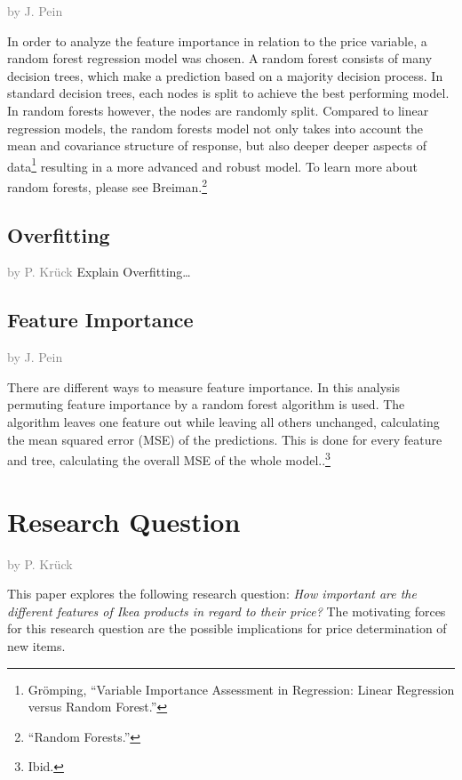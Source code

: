 \documentclass[a4paper, nobind]{templates/ociamthesis}
\begin{document}
\textcolor{gray}{by J. Pein}

In order to analyze the feature importance in relation to the price variable, a random forest regression model was chosen. A random forest consists of many decision trees, which make a prediction based on a majority decision process. In standard decision trees, each nodes is split to achieve the best performing model. In random forests however, the nodes are randomly split. Compared to linear regression models, the random forests model not only takes into account the mean and covariance structure of response, but also deeper deeper aspects of data\footnote{Grömping, ``Variable Importance Assessment in Regression: Linear Regression versus Random Forest.''} resulting in a more advanced and robust model. To learn more about random forests, please see Breiman.\footnote{``Random Forests.''}

\hypertarget{overfitting}{%
\subsection{Overfitting}\label{overfitting}}

\textcolor{gray}{by P. Krück}
Explain Overfitting\ldots{}

\hypertarget{feature-importance}{%
\subsection{Feature Importance}\label{feature-importance}}

\textcolor{gray}{by J. Pein}

There are different ways to measure feature importance. In this analysis permuting feature importance by a random forest algorithm is used. The algorithm leaves one feature out while leaving all others unchanged, calculating the mean squared error (MSE) of the predictions. This is done for every feature and tree, calculating the overall MSE of the whole model..\footnote{Ibid.}

\hypertarget{research-question}{%
\section{Research Question}\label{research-question}}

\textcolor{gray}{by P. Krück}

This paper explores the following research question: \emph{How important are the different features of Ikea products in regard to their price?}
The motivating forces for this research question are the possible implications for price determination of new items.
\end{document}
